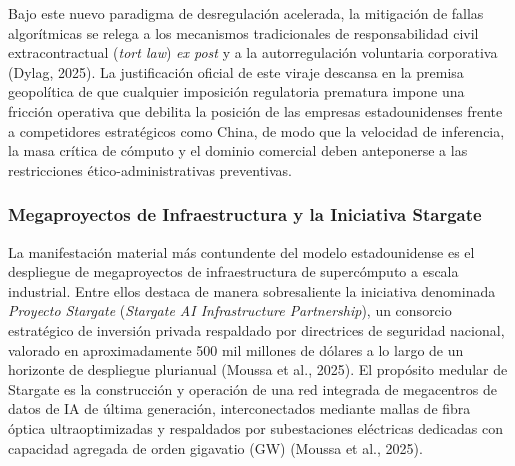 Bajo este nuevo paradigma de desregulación acelerada, la mitigación de fallas algorítmicas se relega a los mecanismos tradicionales de responsabilidad civil extracontractual (\textit{tort law}) \textit{ex post} y a la autorregulación voluntaria corporativa (Dylag, 2025). La justificación oficial de este viraje descansa en la premisa geopolítica de que cualquier imposición regulatoria prematura impone una fricción operativa que debilita la posición de las empresas estadounidenses frente a competidores estratégicos como China, de modo que la velocidad de inferencia, la masa crítica de cómputo y el dominio comercial deben anteponerse a las restricciones ético-administrativas preventivas.

\subsubsection{Megaproyectos de Infraestructura y la Iniciativa Stargate}

La manifestación material más contundente del modelo estadounidense es el despliegue de megaproyectos de infraestructura de supercómputo a escala industrial. Entre ellos destaca de manera sobresaliente la iniciativa denominada \textit{Proyecto Stargate} (\textit{Stargate AI Infrastructure Partnership}), un consorcio estratégico de inversión privada respaldado por directrices de seguridad nacional, valorado en aproximadamente 500 mil millones de dólares a lo largo de un horizonte de despliegue plurianual (Moussa et al., 2025). El propósito medular de Stargate es la construcción y operación de una red integrada de megacentros de datos de IA de última generación, interconectados mediante mallas de fibra óptica ultraoptimizadas y respaldados por subestaciones eléctricas dedicadas con capacidad agregada de orden gigavatio (GW) (Moussa et al., 2025).

